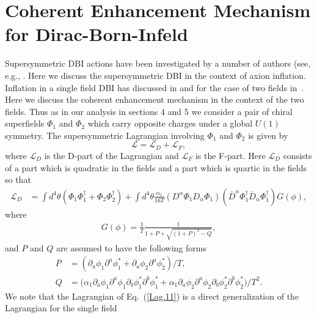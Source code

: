\documentclass[12pt]{article}
\def\non{\nonumber\\}
\begin{document}
\section{Coherent Enhancement Mechanism for Dirac-Born-Infeld \label{sec7}}
Supersymmetric DBI actions have been investigated by a number of authors
  (see, e.g., \cite{Khoury:2010gb,Khoury:2011da,Baumann:2011nk,Baumann:2011nm,Rocek:1997hi,Tseytlin:1999dj,Ito:2007hy,Billo:2008sp,Sasaki:2012ka,Aoki:2016tod}.
  Here we discuss the supersymmetric DBI in the context of axion inflation.
  Inflation in a  single field DBI has discussed in \cite{Sasaki:2012ka} and for the case of two fields in~\cite{Nath:2018xxe}.
  Here we discuss the coherent enhancement mechanism in the context of the two fields.
Thus  as in our analysis in sections  4 and 5 we consider a pair of chiral superfields $\Phi_1$ and $\Phi_2$ which carry opposite
  charges under a global $U(1)$ symmetry.
  The supersymmetric Lagrangian involving $\Phi_1$ and $\Phi_2$ is given by
  \begin{equation}
    \mathcal{L}= \mathcal{L}_D+\mathcal{L}_{F},
    \label{1.1}
  \end{equation}
  where $\mathcal{L}_D$ is the D-part of the Lagrangian and $\mathcal{L}_{F}$ is the F-part. Here  $\mathcal{L}_D$  
   consists of a part  which is quadratic in the fields and a part  which is quartic in the fields so that
  \begin{align}
    \mathcal{L}_D
    &= \int d^4\theta \left(\Phi_1 \Phi_1^\dagger + \Phi_2 \Phi_2^\dagger \right)+      \int d^4\theta
      \frac{\alpha_1}{16T}\left(D^\alpha \Phi_1 D_\alpha \Phi_1\right)\left({\bar{D}}^{\dot{\alpha}}\Phi_1^\dagger {\bar{D}}_{\dot{\alpha}}\Phi_1^\dagger \right)
      G(\phi),
      \label{Lag.11}
\end{align}
where 
  \begin{align}
    G(\phi) = \frac{1}{T}\frac{1}{1+ P +\sqrt{(1+P)^2 -Q}},
  \end{align}
and $P$ and $Q$ are assumed to have the following forms
  \begin{align}
    P&= (\partial_a\phi_1 \partial^a \phi^*_1 + \partial_a\phi_2 \partial^a \phi^*_2)/T, \non
    Q &= \Big(
      \alpha_1\partial_a \phi_1 \partial^a \phi_1 \partial_b \phi^*_1 \partial^b \phi^*_1
      + \alpha_1 \partial_a \phi_2 \partial^a \phi_2 \partial_b \phi^*_2 \partial^b \phi^*_2
     \Big) / T^2.
    \label{Lag.22}
  \end{align}
  We note that the Lagrangian of Eq.~(\ref{Lag.11}) is a direct generalization of the Lagrangian for the single field
\end{document}
